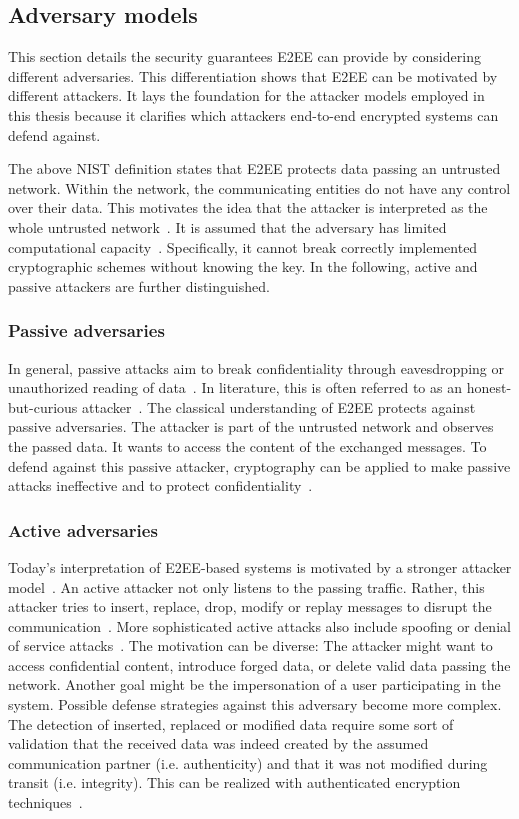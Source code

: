 \documentclass[../main.tex]{subfiles}
\begin{document}
\subsection{Adversary models}
This section details the security guarantees E2EE can provide by considering different adversaries.
This differentiation shows that E2EE can be motivated by different attackers.
It lays the foundation for the attacker models employed in this thesis because it clarifies which attackers end-to-end encrypted systems can defend against.

The above NIST definition states that E2EE protects data passing an untrusted network.
Within the network, the communicating entities do not have any control over their data.
This motivates the idea that the attacker is interpreted as the whole untrusted network~\cite{Nabeel2017}.
It is assumed that the adversary has limited computational capacity~\cite{Katz2020}. 
Specifically, it cannot break correctly implemented cryptographic schemes without knowing the key.
In the following, active and passive attackers are further distinguished. 

\subsubsection{Passive adversaries}
In general, passive attacks aim to break confidentiality through eavesdropping or unauthorized reading of data~\cite[18]{Eckert2018}. 
In literature, this is often referred to as an honest-but-curious attacker~\cite{Nabeel2017}.
The classical understanding of E2EE protects against passive adversaries. 
The attacker is part of the untrusted network and observes the passed data.
It wants to access the content of the exchanged messages.
To defend against this passive attacker, cryptography can be applied to make passive attacks ineffective and to protect confidentiality~\cite[18]{Eckert2018}.


\subsubsection{Active adversaries}
Today's interpretation of E2EE-based systems is motivated by a stronger attacker model~\cite{Hale2022}.
An active attacker not only listens to the passing traffic.
Rather, this attacker tries to insert, replace, drop, modify or replay messages to disrupt the communication~\cite{Nabeel2017}.
More sophisticated active attacks also include spoofing or denial of service attacks~\cite[19]{Eckert2018}.
The motivation can be diverse: 
The attacker might want to access confidential content, introduce forged data, or delete valid data passing the network.
Another goal might be the impersonation of a user participating in the system.
Possible defense strategies against this adversary become more complex.
The detection of inserted, replaced or modified data require some sort of validation that the received data was indeed created by the assumed communication partner (i.e. authenticity) and that it was not modified during transit (i.e. integrity).
This can be realized with authenticated encryption techniques~\cite{Mallory2022}.
\end{document}
